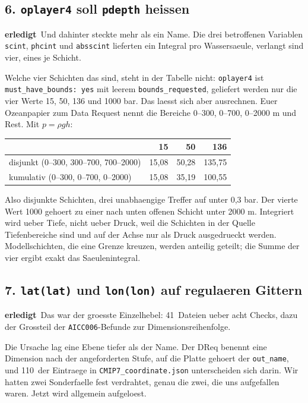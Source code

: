 \documentclass[11pt,a4paper]{article}
\newcommand{\code}[1]{\texttt{\small #1}}
\newcommand{\ok}{\textcolor{green!45!black}{\textbf{erledigt}}}
\begin{document}
\subsection*{6. \code{oplayer4} soll \code{pdepth} heissen}
\ok\ Und dahinter steckte mehr als ein Name. Die drei betroffenen Variablen
\code{scint}, \code{phcint} und \code{absscint} lieferten ein Integral pro
Wassersaeule, verlangt sind vier, eines je Schicht.

Welche vier Schichten das sind, steht in der Tabelle nicht: \code{oplayer4} ist
\code{must\_have\_bounds: yes} mit leerem \code{bounds\_requested}, geliefert werden
nur die vier Werte 15, 50, 136 und 1000 bar. Das laesst sich aber ausrechnen. Euer
Ozeanpapier zum Data Request nennt die Bereiche 0--300, 0--700, 0--2000 m und Rest.
Mit $p = \rho g h$:

\begin{center}
\begin{tabular}{lrrr}
\toprule
& \textbf{15} & \textbf{50} & \textbf{136} \\
\midrule
disjunkt (0--300, 300--700, 700--2000) & 15{,}08 & 50{,}28 & 135{,}75 \\
kumulativ (0--300, 0--700, 0--2000)    & 15{,}08 & 35{,}19 & 100{,}55 \\
\bottomrule
\end{tabular}
\end{center}

Also disjunkte Schichten, drei unabhaengige Treffer auf unter 0{,}3 bar. Der vierte
Wert 1000 gehoert zu einer nach unten offenen Schicht unter 2000 m. Integriert wird
ueber Tiefe, nicht ueber Druck, weil die Schichten in der Quelle Tiefenbereiche sind
und auf der Achse nur als Druck ausgedrueckt werden. Modellschichten, die eine Grenze
kreuzen, werden anteilig geteilt; die Summe der vier ergibt exakt das
Saeulenintegral.

\subsection*{7. \code{lat(lat)} und \code{lon(lon)} auf regulaeren Gittern}
\ok\ Das war der groesste Einzelhebel: 41~Dateien ueber acht Checks, dazu der
Grossteil der \code{AICC006}-Befunde zur Dimensionsreihenfolge.

Die Ursache lag eine Ebene tiefer als der Name. Der DReq benennt eine Dimension nach
der angeforderten Stufe, auf die Platte gehoert der \code{out\_name}, und 110~der
Eintraege in \code{CMIP7\_coordinate.json} unterscheiden sich darin. Wir hatten zwei
Sonderfaelle fest verdrahtet, genau die zwei, die uns aufgefallen waren. Jetzt wird
allgemein aufgeloest.
\end{document}
